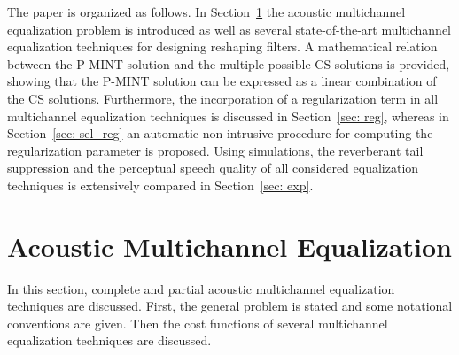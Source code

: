 \documentclass[draftcls,onecolumn,11pt]{IEEEtran}
\begin{document}
The paper is organized as follows.
In Section~\ref{sec: intro} the acoustic multichannel equalization problem is introduced as well as several state-of-the-art multichannel equalization  techniques for designing reshaping filters.
A mathematical relation between the P-MINT solution and the multiple possible CS solutions is provided, showing that the P-MINT solution can be expressed as a linear combination of the CS solutions.
Furthermore, the incorporation of a regularization term in all multichannel equalization techniques is discussed in Section~\ref{sec: reg}, whereas in  Section~\ref{sec: sel_reg} an automatic non-intrusive procedure for computing the regularization parameter is proposed.
Using simulations, the reverberant tail suppression and the perceptual speech quality of all considered equalization techniques is extensively compared in Section~\ref{sec: exp}.

\section{Acoustic Multichannel Equalization}
\label{sec: intro}
In this section, complete and partial acoustic multichannel equalization techniques are discussed.
First, the general problem is stated and some notational conventions are given.
Then the cost functions of several multichannel equalization techniques are discussed.
\end{document}
